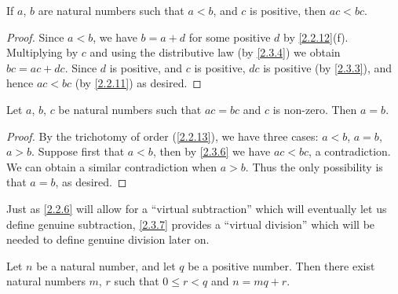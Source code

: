 \begin{prop}\label{2.3.6}
  If \(a\), \(b\) are natural numbers such that \(a < b\), and \(c\) is positive, then \(ac < bc\).
\end{prop}

\begin{proof}
  Since \(a < b\), we have \(b = a + d\) for some positive \(d\) by \cref{2.2.12}(f).
  Multiplying by \(c\) and using the distributive law (by \cref{2.3.4}) we obtain \(bc = ac + dc\).
  Since \(d\) is positive, and \(c\) is positive, \(dc\) is positive (by \cref{2.3.3}), and hence \(ac < bc\) (by \cref{2.2.11}) as desired.
\end{proof}

\begin{cor}\label{2.3.7}
  Let \(a\), \(b\), \(c\) be natural numbers such that \(ac = bc\) and \(c\) is non-zero.
  Then \(a = b\).
\end{cor}

\begin{proof}
  By the trichotomy of order (\cref{2.2.13}), we have three cases: \(a < b\), \(a = b\), \(a > b\).
  Suppose first that \(a < b\), then by \cref{2.3.6} we have \(ac < bc\), a contradiction.
  We can obtain a similar contradiction when \(a > b\).
  Thus the only possibility is that \(a = b\), as desired.
\end{proof}

\begin{rmk}\label{2.3.8}
  Just as \cref{2.2.6} will allow for a ``virtual subtraction'' which will eventually let us define genuine subtraction, \cref{2.3.7} provides a ``virtual division'' which will be needed to define genuine division later on.
\end{rmk}

\begin{prop}\label{2.3.9}
  Let \(n\) be a natural number, and let \(q\) be a positive number.
  Then there exist natural numbers \(m\), \(r\) such that \(0 \leq r < q\) and \(n = mq + r\).
\end{prop}

